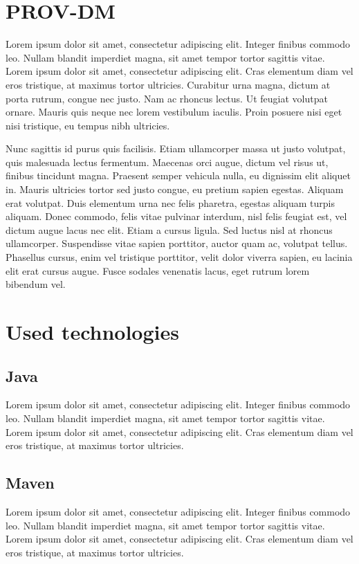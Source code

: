 \documentclass[
  digital,     %
  oneside,     %
  nosansbold,  %
  nocolorbold, %
  lof,         %
  lot,         %
]{fithesis4}
\begin{document}
\chapter{PROV-DM}
\shorthandoff{-}
Lorem ipsum dolor sit amet, consectetur adipiscing elit. Integer finibus commodo leo. Nullam blandit imperdiet magna, sit amet tempor tortor sagittis vitae. Lorem ipsum dolor sit amet, consectetur adipiscing elit. Cras elementum diam vel eros tristique, at maximus tortor ultricies. Curabitur urna magna, dictum at porta rutrum, congue nec justo. Nam ac rhoncus lectus. Ut feugiat volutpat ornare. Mauris quis neque nec lorem vestibulum iaculis. Proin posuere nisi eget nisi tristique, eu tempus nibh ultricies.

Nunc sagittis id purus quis facilisis. Etiam ullamcorper massa ut justo volutpat, quis malesuada lectus fermentum. Maecenas orci augue, dictum vel risus ut, finibus tincidunt magna. Praesent semper vehicula nulla, eu dignissim elit aliquet in. Mauris ultricies tortor sed justo congue, eu pretium sapien egestas. Aliquam erat volutpat. Duis elementum urna nec felis pharetra, egestas aliquam turpis aliquam. Donec commodo, felis vitae pulvinar interdum, nisl felis feugiat est, vel dictum augue lacus nec elit. Etiam a cursus ligula. Sed luctus nisl at rhoncus ullamcorper. Suspendisse vitae sapien porttitor, auctor quam ac, volutpat tellus. Phasellus cursus, enim vel tristique porttitor, velit dolor viverra sapien, eu lacinia elit erat cursus augue. Fusce sodales venenatis lacus, eget rutrum lorem bibendum vel.
\shorthandon{-}

\chapter{Used technologies}
\shorthandoff{-}
\section{Java}
Lorem ipsum dolor sit amet, consectetur adipiscing elit. Integer finibus commodo leo. Nullam blandit imperdiet magna, sit amet tempor tortor sagittis vitae. Lorem ipsum dolor sit amet, consectetur adipiscing elit. Cras elementum diam vel eros tristique, at maximus tortor ultricies.
\section{Maven}
Lorem ipsum dolor sit amet, consectetur adipiscing elit. Integer finibus commodo leo. Nullam blandit imperdiet magna, sit amet tempor tortor sagittis vitae. Lorem ipsum dolor sit amet, consectetur adipiscing elit. Cras elementum diam vel eros tristique, at maximus tortor ultricies.
\end{document}
